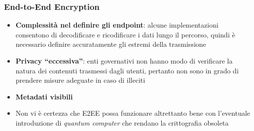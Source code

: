 \begin{frame}
    \frametitle{End-to-End Encryption} 
    \begin{itemize}
        \item \textbf{Complessità nel definire gli endpoint}: alcune implementazioni consentono di decodificare e ricodificare i dati lungo il percorso, quindi è necessario definire accuratamente gli estremi della trasmissione\pause
        \item \textbf{Privacy ``eccessiva''}: enti governativi non hanno modo di verificare la natura dei contenuti trasmessi dagli utenti, pertanto non sono in grado di prendere misure adeguate in caso di illeciti\pause
        \item \textbf{Metadati visibili}\pause
        \item Non vi è certezza che E2EE possa funzionare altrettanto bene con l'eventuale introduzione di \textit{quantum computer} che rendano la crittografia obsoleta
    \end{itemize}
    \cite{techTarget}
\end{frame}